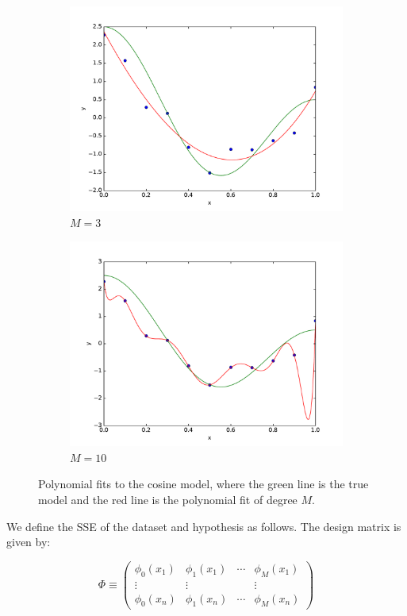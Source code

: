 \documentclass[psamsfonts]{amsart}
\theoremstyle{definition}
\theoremstyle{remark}
\numberwithin{equation}{section}
\begin{document}
\begin{figure}
\begin{subfigure}[b]{0.24\textwidth}
		\includegraphics[width=\textwidth]{hw1_2-1_3.pdf}
		\caption{$M=3$}
	\end{subfigure}
	\begin{subfigure}[b]{0.24\textwidth}
		\includegraphics[width=\textwidth]{hw1_2-1_10.pdf}
		\caption{$M=10$}
	\end{subfigure}
	\caption{Polynomial fits to the cosine model, where the green line is the true model and the red line is the polynomial fit of degree $M$.}
\end{figure}

We define the SSE of the dataset and hypothesis as follows. The design matrix is given by:

$$\Phi \equiv \begin{pmatrix} \phi_0(x_1) & \phi_1(x_1) & \cdots & \phi_M(x_1) \\ \vdots & \vdots &  & \vdots \\ \phi_0(x_n) & \phi_1(x_n) & \cdots & \phi_M(x_n)\end{pmatrix}$$
\end{document}
